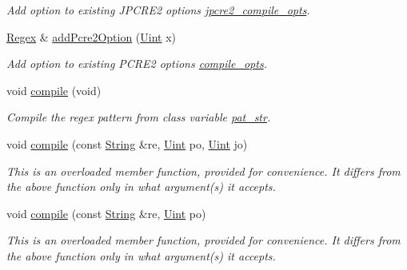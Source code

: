 \begin{DoxyCompactItemize}
\begin{DoxyCompactList}\small\item\em Add option to existing J\+P\+C\+R\+E2 options \hyperlink{classjpcre2_1_1Regex_abdd26c3bc1c3132f0aa73dde1690a7ef}{jpcre2\+\_\+compile\+\_\+opts}. \end{DoxyCompactList}\item 
\hyperlink{classjpcre2_1_1Regex}{Regex} \& \hyperlink{classjpcre2_1_1Regex_a2c7dcf12f26b2b046e147b013c8b5087_a2c7dcf12f26b2b046e147b013c8b5087}{add\+Pcre2\+Option} (\hyperlink{namespacejpcre2_a078242d38221a13fb3543b9edd78c099}{Uint} x)
\begin{DoxyCompactList}\small\item\em Add option to existing P\+C\+R\+E2 options \hyperlink{classjpcre2_1_1Regex_a5954131e9085de63229ed5c11417df69}{compile\+\_\+opts}. \end{DoxyCompactList}\item 
void \hyperlink{classjpcre2_1_1Regex_aad1d5ef1e87f762f68a587eec4022e69_aad1d5ef1e87f762f68a587eec4022e69}{compile} (void)
\begin{DoxyCompactList}\small\item\em Compile the regex pattern from class variable \hyperlink{classjpcre2_1_1Regex_a0bceb85b6dbba355b56b5cc312214435}{pat\+\_\+str}. \end{DoxyCompactList}\item 
void \hyperlink{classjpcre2_1_1Regex_a4640915bc907aa3b80da543f1eb7e74f_a4640915bc907aa3b80da543f1eb7e74f}{compile} (const \hyperlink{namespacejpcre2_a91f03070152fb228bc116c5a737f1d16}{String} \&re, \hyperlink{namespacejpcre2_a078242d38221a13fb3543b9edd78c099}{Uint} po, \hyperlink{namespacejpcre2_a078242d38221a13fb3543b9edd78c099}{Uint} jo)
\begin{DoxyCompactList}\small\item\em This is an overloaded member function, provided for convenience. It differs from the above function only in what argument(s) it accepts. \end{DoxyCompactList}\item 
void \hyperlink{classjpcre2_1_1Regex_a01394dcb222c4d442cabbffb4bcf570a_a01394dcb222c4d442cabbffb4bcf570a}{compile} (const \hyperlink{namespacejpcre2_a91f03070152fb228bc116c5a737f1d16}{String} \&re, \hyperlink{namespacejpcre2_a078242d38221a13fb3543b9edd78c099}{Uint} po)
\begin{DoxyCompactList}\small\item\em This is an overloaded member function, provided for convenience. It differs from the above function only in what argument(s) it accepts. \end{DoxyCompactList}\item 

\end{DoxyCompactItemize}
